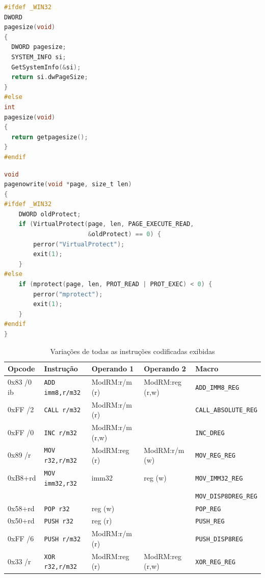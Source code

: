 \begin{lstlisting}[language=C, caption={Tamanho, em bytes, de uma
    página}, frame=tb]
#ifdef _WIN32
DWORD
pagesize(void)
{
  DWORD pagesize;
  SYSTEM_INFO si;
  GetSystemInfo(&si);
  return si.dwPageSize;
}
#else
int
pagesize(void)
{
  return getpagesize();
}
#endif
\end{lstlisting}


\begin{lstlisting}[language=C, caption={Remoção da permissão de
    escrita de uma ou mais páginas}, frame=tb]
void
pagenowrite(void *page, size_t len)
{
#ifdef _WIN32
    DWORD oldProtect;
    if (VirtualProtect(page, len, PAGE_EXECUTE_READ,
                       &oldProtect) == 0) {
        perror("VirtualProtect");
        exit(1);
    }
#else
    if (mprotect(page, len, PROT_READ | PROT_EXEC) < 0) {
        perror("mprotect");
        exit(1);
    }
#endif
}
\end{lstlisting}

\renewcommand{\arraystretch}{1.2}
\begin{table}[ht!]
  \caption{Variações de todas as instruções codificadas
    exibidas\label{opencoding}}
  \centering
  \begin{tabular}{l l l l l}
    \toprule
    Opcode  & Instrução     & Operando 1    & Operando 2    & Macro \\
    \midrule

    0x83 /0 ib & \verb!ADD imm8,r/m32! & ModRM:r/m (r) & ModRM:reg
    (r,w) & \verb!ADD_IMM8_REG! \\

    0xFF /2 & \verb!CALL r/m32! & ModRM:r/m (r) &      &
    \verb!CALL_ABSOLUTE_REG! \\

    0xFF /0 & \verb!INC r/m32! & ModRM:r/m (r,w) &  & \verb!INC_DREG! \\

    0x89 /r & \verb!MOV r32,r/m32!& ModRM:reg (r) & ModRM:r/m (w) &
    \verb!MOV_REG_REG! \\
\hline
    0xB8+rd & \verb!MOV imm32,r32! & imm32 & reg (w)
    & \verb!MOV_IMM32_REG! \\
    & & & & \verb!MOV_DISP8DREG_REG! \\ \hline

    0x58+rd & \verb!POP r32!     & reg (w)       &        & \verb!POP_REG!\\

    0x50+rd & \verb!PUSH r32!    & reg (r)       &        & \verb!PUSH_REG!\\
    0xFF /6 & \verb!PUSH r/m32!  & ModRM:r/m (r) &        & \verb!PUSH_DISP8REG!\\

    0x33 /r & \verb!XOR r32,r/m32!& ModRM:reg (r) & ModRM:reg (r,w)&
    \verb!XOR_REG_REG! \\

    \bottomrule
  \end{tabular}
\end{table}
